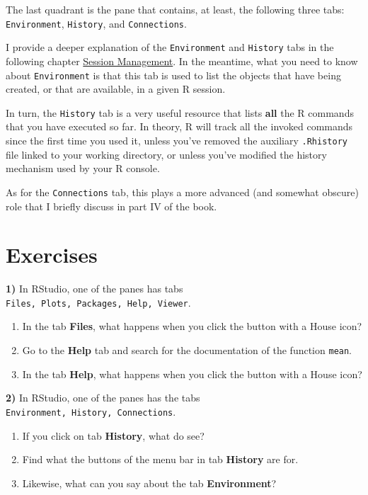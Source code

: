\documentclass[
]{book}
\providecommand{\tightlist}{%
  \setlength{\itemsep}{0pt}\setlength{\parskip}{0pt}}
\begin{document}
The last quadrant is the pane that contains, at least, the following three
tabs: \texttt{Environment}, \texttt{History}, and \texttt{Connections}.

I provide a deeper explanation of the \texttt{Environment} and \texttt{History} tabs in the
following chapter \protect\hyperlink{session}{Session Management}. In the meantime, what you
need to know about \texttt{Environment} is that this tab is used to list the objects
that have being created, or that are available, in a given R session.

In turn, the \texttt{History} tab is a very useful resource that lists \textbf{all} the R
commands that you have executed so far. In theory, R will track all the invoked
commands since the first time you used it, unless you've removed the auxiliary
\texttt{.Rhistory} file linked to your working directory, or unless you've modified
the history mechanism used by your R console.

As for the \texttt{Connections} tab, this plays a more advanced (and somewhat obscure)
role that I briefly discuss in part IV of the book.

\hypertarget{exercises-1}{%
\section{Exercises}\label{exercises-1}}

\textbf{1)} In RStudio, one of the panes has tabs \texttt{Files,\ Plots,\ Packages,\ Help,\ Viewer}.

\begin{enumerate}
\def\labelenumi{\alph{enumi})}
\tightlist
\item
  In the tab \textbf{Files}, what happens when you click the button with a House icon?
\item
  Go to the \textbf{Help} tab and search for the documentation of the function \texttt{mean}.
\item
  In the tab \textbf{Help}, what happens when you click the button with a House icon?
\end{enumerate}

\textbf{2)} In RStudio, one of the panes has the tabs \texttt{Environment,\ History,\ Connections}.

\begin{enumerate}
\def\labelenumi{\alph{enumi})}
\tightlist
\item
  If you click on tab \textbf{History}, what do see?
\item
  Find what the buttons of the menu bar in tab \textbf{History} are for.
\item
  Likewise, what can you say about the tab \textbf{Environment}?
\end{enumerate}
\end{document}
